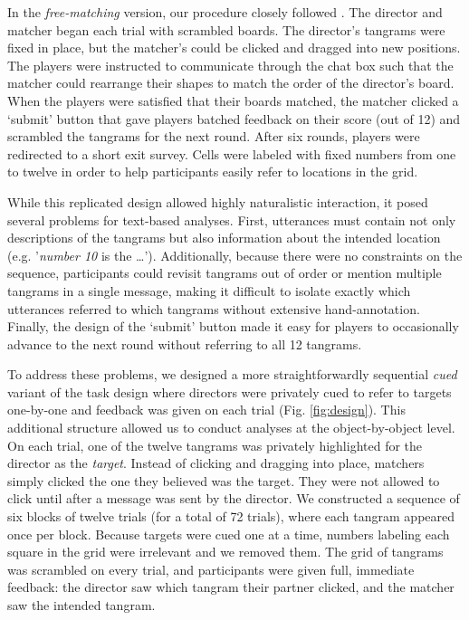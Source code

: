 \documentclass[alpha-refs]{wiley-article}
\begin{document}
In the \emph{free-matching} version, our procedure closely followed \cite{ClarkWilkesGibbs86_ReferringCollaborative}. 
The director and matcher began each trial with scrambled boards. 
The director's tangrams were fixed in place, but the matcher's could be clicked and dragged into new positions.
The players were instructed to communicate through the chat box such that the matcher could rearrange their shapes to match the order of the director's board.
When the players were satisfied that their boards matched, the matcher clicked a `submit' button that gave players batched feedback on their score (out of 12) and scrambled the tangrams for the next round. 
After six rounds, players were redirected to a short exit survey. 
Cells were labeled with fixed numbers from one to twelve in order to help participants easily refer to locations in the grid.

While this replicated design allowed highly naturalistic interaction, it posed several problems for text-based analyses. 
First, utterances must contain not only descriptions of the tangrams but also information about the intended location (e.g. '\emph{number 10} is the \dots'). 
Additionally, because there were no constraints on the sequence, participants could revisit tangrams out of order or mention multiple tangrams in a single message, making it difficult to isolate exactly which utterances referred to which tangrams without extensive hand-annotation. 
Finally, the design of the `submit' button made it easy for players to occasionally advance to the next round without referring to all 12 tangrams. 

To address these problems, we designed a more straightforwardly sequential \emph{cued} variant of the task design where directors were privately cued to refer to targets one-by-one and feedback was given on each trial (Fig. \ref{fig:design}).
This additional structure allowed us to conduct analyses at the object-by-object level. 
On each trial, one of the twelve tangrams was privately highlighted for the director as the \emph{target}. 
Instead of clicking and dragging into place, matchers simply clicked the one they believed was the target. 
They were not allowed to click until after a message was sent by the director.  
We constructed a sequence of six blocks of twelve trials (for a total of 72 trials), where each tangram appeared once per block.
Because targets were cued one at a time, numbers labeling each square in the grid were irrelevant and we removed them. 
The grid of tangrams was scrambled on every trial, and participants were given full, immediate feedback: the director saw which tangram their partner clicked, and the matcher saw the intended tangram.
\end{document}
